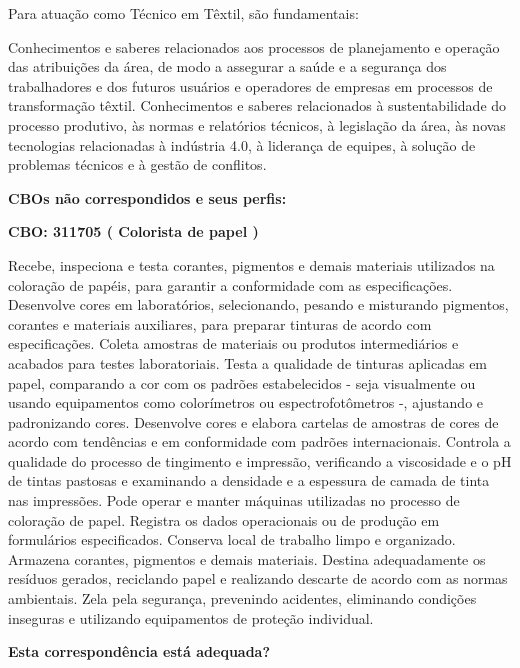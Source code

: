\documentclass[
]{article}
\begin{document}
Para atuação como Técnico em Têxtil, são fundamentais:

Conhecimentos e saberes relacionados aos processos de planejamento e
operação das atribuições da área, de modo a assegurar a saúde e a
segurança dos trabalhadores e dos futuros usuários e operadores de
empresas em processos de transformação têxtil. Conhecimentos e saberes
relacionados à sustentabilidade do processo produtivo, às normas e
relatórios técnicos, à legislação da área, às novas tecnologias
relacionadas à indústria 4.0, à liderança de equipes, à solução de
problemas técnicos e à gestão de conflitos.

\textbf{CBOs não correspondidos e seus perfis:}

\textbf{CBO: 311705  ( Colorista de papel )}

Recebe, inspeciona e testa corantes, pigmentos e demais materiais
utilizados na coloração de papéis, para garantir a conformidade com as
especificações. Desenvolve cores em laboratórios, selecionando, pesando
e misturando pigmentos, corantes e materiais auxiliares, para preparar
tinturas de acordo com especificações. Coleta amostras de materiais ou
produtos intermediários e acabados para testes laboratoriais. Testa a
qualidade de tinturas aplicadas em papel, comparando a cor com os
padrões estabelecidos - seja visualmente ou usando equipamentos como
colorímetros ou espectrofotômetros -, ajustando e padronizando cores.
Desenvolve cores e elabora cartelas de amostras de cores de acordo com
tendências e em conformidade com padrões internacionais. Controla a
qualidade do processo de tingimento e impressão, verificando a
viscosidade e o pH de tintas pastosas e examinando a densidade e a
espessura de camada de tinta nas impressões. Pode operar e manter
máquinas utilizadas no processo de coloração de papel. Registra os dados
operacionais ou de produção em formulários especificados. Conserva local
de trabalho limpo e organizado. Armazena corantes, pigmentos e demais
materiais. Destina adequadamente os resíduos gerados, reciclando papel e
realizando descarte de acordo com as normas ambientais. Zela pela
segurança, prevenindo acidentes, eliminando condições inseguras e
utilizando equipamentos de proteção individual.

\begin{Form}
\textbf{Esta correspondência está adequada?} \\ 
\end{Form}
\end{document}
